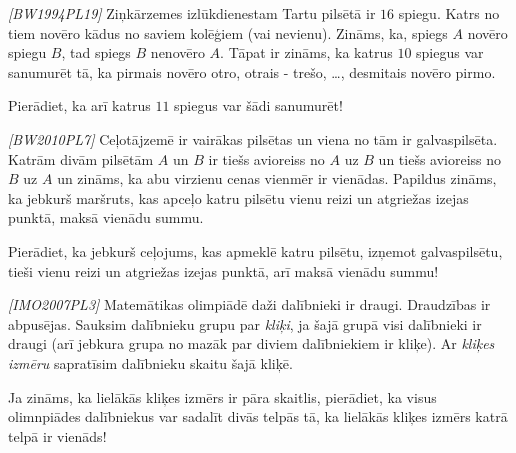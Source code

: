 



\renewcommand{\theenumi}{\alph{enumi}}



\noindent
 
\filbreak

\begin{problem}
\textit{[BW1994PL19]}
Ziņkārzemes izlūkdienestam Tartu pilsētā ir $16$ spiegu. Katrs no tiem novēro kādus no saviem kolēģiem (vai nevienu). Zināms, ka, spiegs $A$ novēro spiegu $B$, tad spiegs $B$ nenovēro $A$. Tāpat ir zināms, ka katrus $10$ spiegus var sanumurēt tā, ka pirmais novēro otro, otrais - trešo, \dots, desmitais novēro pirmo.

Pierādiet, ka arī katrus $11$ spiegus var šādi sanumurēt!
\end{problem}
%

\begin{problem}
\textit{[BW2010PL7]}
Ceļotājzemē ir vairākas pilsētas un viena no tām ir galvaspilsēta. Katrām divām pilsētām $A$ un $B$ ir tiešs avioreiss no $A$ uz $B$ un tiešs avioreiss no $B$ uz $A$ un zināms, ka abu virzienu cenas vienmēr ir vienādas. Papildus zināms, ka jebkurš maršruts, kas apceļo katru pilsētu vienu reizi un atgriežas izejas punktā, maksā vienādu summu.

Pierādiet, ka jebkurš ceļojums, kas apmeklē katru pilsētu, izņemot galvaspilsētu, tieši vienu reizi un atgriežas izejas punktā, arī maksā vienādu summu!
\end{problem}
%

\begin{problem}
\textit{[IMO2007PL3]}
Matemātikas olimpiādē daži dalībnieki ir draugi. Draudzības ir abpusējas. Sauksim dalībnieku grupu par \textit{kliķi}, ja šajā grupā visi dalībnieki ir draugi (arī jebkura grupa no mazāk par diviem dalībniekiem ir kliķe). Ar \textit{kliķes izmēru} sapratīsim dalībnieku skaitu šajā kliķē.

Ja zināms, ka lielākās kliķes izmērs ir pāra skaitlis, pierādiet, ka visus olimnpiādes dalībniekus var sadalīt divās telpās tā, ka lielākās kliķes izmērs katrā telpā ir vienāds!
\end{problem}
%

